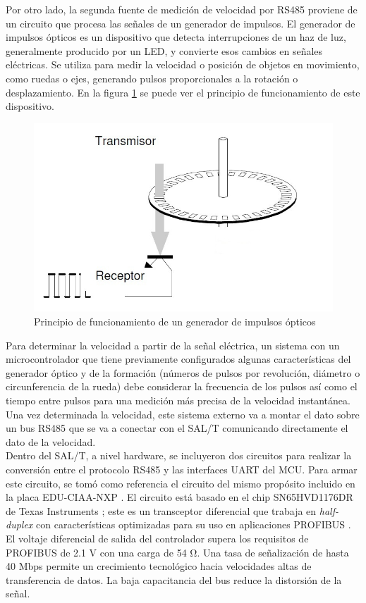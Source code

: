 Por otro lado, la segunda fuente de medición de velocidad por RS485 proviene de un circuito que procesa las señales de un generador de impulsos. El generador de impulsos ópticos es un dispositivo que detecta interrupciones de un haz de luz, generalmente producido por un LED, y convierte esos cambios en señales eléctricas. Se utiliza para medir la velocidad o posición de objetos en movimiento, como ruedas o ejes, generando pulsos proporcionales a la rotación o desplazamiento. En la figura \ref{fig:pulse_generator} se puede ver el principio de funcionamiento de este dispositivo. 


\begin{figure}[H]
    \centering
    \includegraphics[width = 0.7 \linewidth]{img/pulse_generator.jpeg}
    \caption{Principio de funcionamiento de un generador de impulsos ópticos}
    \label{fig:pulse_generator}
\end{figure}    


Para determinar la velocidad a partir de la señal eléctrica, un sistema con un microcontrolador que tiene previamente configurados algunas características del generador óptico y de la formación (números de pulsos por revolución, diámetro o circunferencia de la rueda) debe considerar la frecuencia de los pulsos así como el tiempo entre pulsos para una medición más precisa de la velocidad instantánea. Una vez determinada la velocidad, este sistema externo va a montar el dato sobre un bus RS485 que se va a conectar con el SAL/T comunicando directamente el dato de la velocidad. \\ 


Dentro del SAL/T, a nivel hardware, se incluyeron dos circuitos para realizar la conversión entre el protocolo RS485 y las interfaces UART del MCU. Para armar este circuito, se tomó como referencia el circuito del mismo propósito incluido en la placa EDU-CIAA-NXP \cite{edu-ciaa}. El circuito está basado en el chip SN65HVD1176DR de Texas Instruments \cite{SN65HVD1176DR}; este es un  transceptor diferencial que trabaja en \textit{half-duplex} con características optimizadas para su uso en aplicaciones PROFIBUS \cite{profibus}. El voltaje diferencial de salida del controlador supera los requisitos de PROFIBUS de 2.1 V con una carga de 54 Ω. Una tasa de señalización de hasta 40 Mbps permite un crecimiento tecnológico hacia velocidades altas de transferencia de datos. La baja capacitancia del bus reduce la distorsión de la señal. \\

